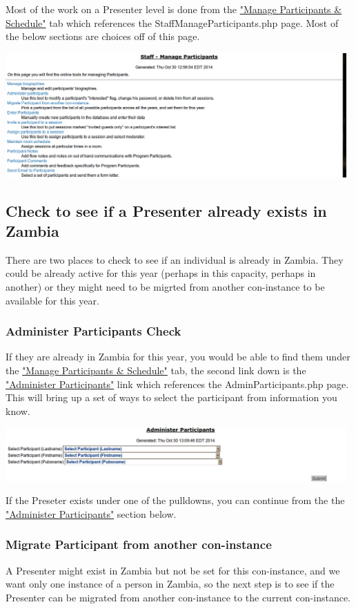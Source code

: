 \documentclass[captions=tablesignature]{scrartcl}
\begin{document}
Most of the work on a Presenter level is done from the \hyperref[sec-2]{"Manage
Participants \& Schedule"} tab which references the
StaffManageParticipants.php page.  Most of the below sections are
choices off of this page.

\includegraphics[width=0.98\textwidth]{./Images/Manage_Participants.png}

\subsection{Check to see if a Presenter already exists in Zambia}
\label{sec-2-1}

There are two places to check to see if an individual is already in
Zambia.  They could be already active for this year (perhaps in
this capacity, perhaps in another) or they might need to be migrted
from another con-instance to be available for this year.

\subsubsection{Administer Participants Check}
\label{sec-2-1-1}
If they are already in Zambia for this year, you would be able to
find them under the \hyperref[sec-2]{"Manage Participants \& Schedule"} tab, the
second link down is the \hyperref[sec-3]{"Administer Participants"} link which
references the AdminParticipants.php page.  This will bring up a
set of ways to select the participant from information you know.

\includegraphics[width=0.98\textwidth]{./Images/Administer_Participants_Header.png}

If the Preseter exists under one of the pulldowns, you can
continue from the the \hyperref[sec-3]{"Administer Participants"} section below.
\subsubsection{Migrate Participant from another con-instance}
\label{sec-2-1-2}
A Presenter might exist in Zambia but not be set for this
con-instance, and we want only one instance of a person in Zambia,
so the next step is to see if the Presenter can be migrated from
another con-instance to the current con-instance.
\end{document}
